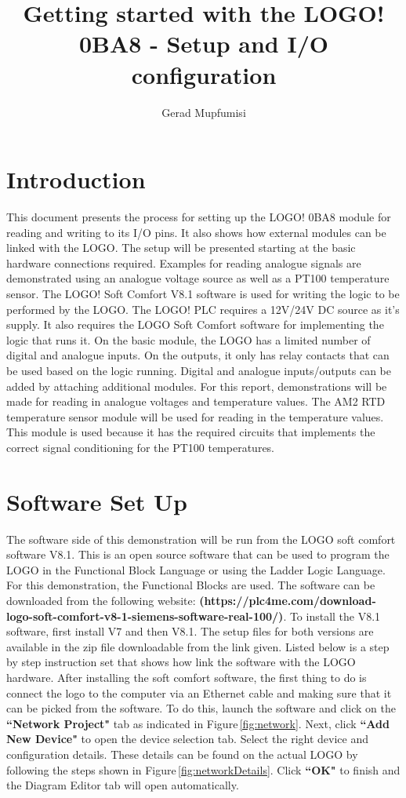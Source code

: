 \documentclass[11pt]{IEEEtran}
\title{Getting started with the LOGO! 0BA8 - Setup and I/O configuration}
\author{Gerad Mupfumisi}
\begin{document}
	\maketitle

\section{Introduction}
\noindent This document presents the process for setting up the LOGO! 0BA8 module for reading and writing to its I/O pins. It also shows how external modules can be linked with the LOGO. The setup will be presented starting at the basic hardware connections required. Examples for reading analogue signals are demonstrated using an analogue voltage source as well as a PT100 temperature sensor. The LOGO! Soft Comfort V8.1 software is used for writing the logic to be performed by the LOGO.  The LOGO! PLC requires a 12V/24V DC source as it's supply. It also requires the LOGO Soft Comfort software for implementing the logic that runs it. On the basic  module, the LOGO has a limited number of digital and analogue inputs. On the outputs, it only has relay contacts that can be used based on the logic running. Digital and analogue inputs/outputs can be added by attaching additional modules. For this report, demonstrations will be made for reading in analogue voltages and temperature values. The AM2 RTD temperature sensor module will be used for reading in the temperature values. This module is used because it has the required circuits that implements the correct signal conditioning for the PT100 temperatures. 

\section{Software Set Up} \label{sec:Software Setup}
\noindent The software side of this demonstration will be run from the LOGO  soft comfort software V8.1. This is an open source software that can be used to program the LOGO in the Functional Block Language or using the Ladder Logic Language. For this demonstration, the Functional Blocks are used. The software can be downloaded from the following website: \textbf{(https://plc4me.com/download-logo-soft-comfort-v8-1-siemens-software-real-100/)}. To install the V8.1 software, first install V7 and then V8.1. The setup files for both versions are available in the zip file downloadable from the link given. Listed below is a step by step instruction set that shows how link the software with the LOGO hardware. After installing the soft comfort software, the first thing to do is connect the logo to the computer via an Ethernet cable and making sure that it can be picked from the software. To do this, launch the software and click on the \textbf{``Network Project"} tab as indicated in Figure\,\ref{fig:network}. Next, click \textbf{``Add New Device"} to open the device selection tab. Select the right device and configuration details. These details can be found on the actual LOGO by following the steps shown in Figure\,\ref{fig:networkDetails}. Click \textbf{``OK"} to finish and the Diagram Editor tab will open automatically. 
\end{document}
